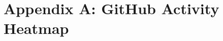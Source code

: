      \chapter{Appendix A: GitHub Activity Heatmap}

     \begin{figure}[H]
     \centering
	\label{fig:github}
	\end{figure}